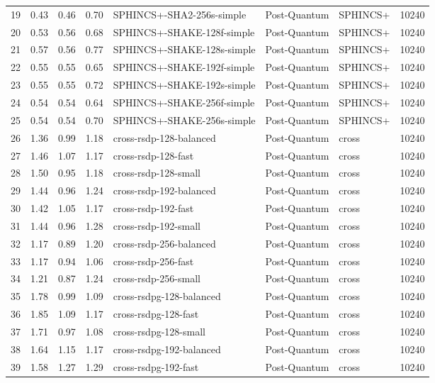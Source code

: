 \begin{table}
\begin{tabular}{lrrrlllr}
19 & 0.43 & 0.46 & 0.70 & SPHINCS+-SHA2-256s-simple & Post-Quantum & SPHINCS+ & 10240 \\
20 & 0.53 & 0.56 & 0.68 & SPHINCS+-SHAKE-128f-simple & Post-Quantum & SPHINCS+ & 10240 \\
21 & 0.57 & 0.56 & 0.77 & SPHINCS+-SHAKE-128s-simple & Post-Quantum & SPHINCS+ & 10240 \\
22 & 0.55 & 0.55 & 0.65 & SPHINCS+-SHAKE-192f-simple & Post-Quantum & SPHINCS+ & 10240 \\
23 & 0.55 & 0.55 & 0.72 & SPHINCS+-SHAKE-192s-simple & Post-Quantum & SPHINCS+ & 10240 \\
24 & 0.54 & 0.54 & 0.64 & SPHINCS+-SHAKE-256f-simple & Post-Quantum & SPHINCS+ & 10240 \\
25 & 0.54 & 0.54 & 0.70 & SPHINCS+-SHAKE-256s-simple & Post-Quantum & SPHINCS+ & 10240 \\
26 & 1.36 & 0.99 & 1.18 & cross-rsdp-128-balanced & Post-Quantum & cross & 10240 \\
27 & 1.46 & 1.07 & 1.17 & cross-rsdp-128-fast & Post-Quantum & cross & 10240 \\
28 & 1.50 & 0.95 & 1.18 & cross-rsdp-128-small & Post-Quantum & cross & 10240 \\
29 & 1.44 & 0.96 & 1.24 & cross-rsdp-192-balanced & Post-Quantum & cross & 10240 \\
30 & 1.42 & 1.05 & 1.17 & cross-rsdp-192-fast & Post-Quantum & cross & 10240 \\
31 & 1.44 & 0.96 & 1.28 & cross-rsdp-192-small & Post-Quantum & cross & 10240 \\
32 & 1.17 & 0.89 & 1.20 & cross-rsdp-256-balanced & Post-Quantum & cross & 10240 \\
33 & 1.17 & 0.94 & 1.06 & cross-rsdp-256-fast & Post-Quantum & cross & 10240 \\
34 & 1.21 & 0.87 & 1.24 & cross-rsdp-256-small & Post-Quantum & cross & 10240 \\
35 & 1.78 & 0.99 & 1.09 & cross-rsdpg-128-balanced & Post-Quantum & cross & 10240 \\
36 & 1.85 & 1.09 & 1.17 & cross-rsdpg-128-fast & Post-Quantum & cross & 10240 \\
37 & 1.71 & 0.97 & 1.08 & cross-rsdpg-128-small & Post-Quantum & cross & 10240 \\
38 & 1.64 & 1.15 & 1.17 & cross-rsdpg-192-balanced & Post-Quantum & cross & 10240 \\
39 & 1.58 & 1.27 & 1.29 & cross-rsdpg-192-fast & Post-Quantum & cross & 10240 \\

\end{tabular}
\end{table}
